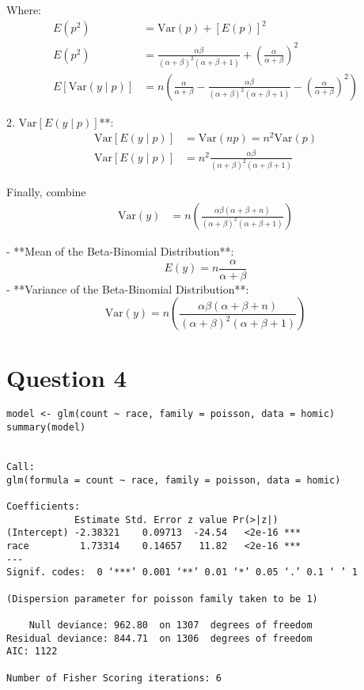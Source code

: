 \documentclass{article}
\begin{document}
   Where:
   \begin{align*}
   E(p^2) &= \text{Var}(p) + [E(p)]^2 \\
   E(p^2) &= \frac{\alpha \beta}{(\alpha + \beta)^2 (\alpha + \beta + 1)} + \left( \frac{\alpha}{\alpha + \beta} \right)^2 \\
   E[\text{Var}(y \mid p)] &= n \left( \frac{\alpha}{\alpha + \beta} - \frac{\alpha \beta}{(\alpha + \beta)^2 (\alpha + \beta + 1)} - \left( \frac{\alpha}{\alpha + \beta} \right)^2 \right)
   \end{align*}

2. \( \text{Var}[E(y \mid p)] \)**:
   \begin{align*}
   \text{Var}[E(y \mid p)] &= \text{Var}(np) = n^2 \text{Var}(p) \\
   \text{Var}[E(y \mid p)] &= n^2 \frac{\alpha \beta}{(\alpha + \beta)^2 (\alpha + \beta + 1)}
   \end{align*}

Finally, combine
\begin{align*}
\text{Var}(y) &= n \left( \frac{\alpha \beta (\alpha + \beta + n)}{(\alpha + \beta)^2 (\alpha + \beta + 1)} \right)
\end{align*}


- **Mean of the Beta-Binomial Distribution**:
  \[
  E(y) = n \frac{\alpha}{\alpha + \beta}
  \]
- **Variance of the Beta-Binomial Distribution**:
  \[
  \text{Var}(y) = n \left( \frac{\alpha \beta (\alpha + \beta + n)}{(\alpha + \beta)^2 (\alpha + \beta + 1)} \right)
  \]




\section*{Question 4}
\begin{verbatim}
model <- glm(count ~ race, family = poisson, data = homic)
summary(model)


Call:
glm(formula = count ~ race, family = poisson, data = homic)

Coefficients:
            Estimate Std. Error z value Pr(>|z|)
(Intercept) -2.38321    0.09713  -24.54   <2e-16 ***
race         1.73314    0.14657   11.82   <2e-16 ***
---
Signif. codes:  0 ‘***’ 0.001 ‘**’ 0.01 ‘*’ 0.05 ‘.’ 0.1 ‘ ’ 1

(Dispersion parameter for poisson family taken to be 1)

    Null deviance: 962.80  on 1307  degrees of freedom
Residual deviance: 844.71  on 1306  degrees of freedom
AIC: 1122

Number of Fisher Scoring iterations: 6
\end{verbatim}
\end{document}
